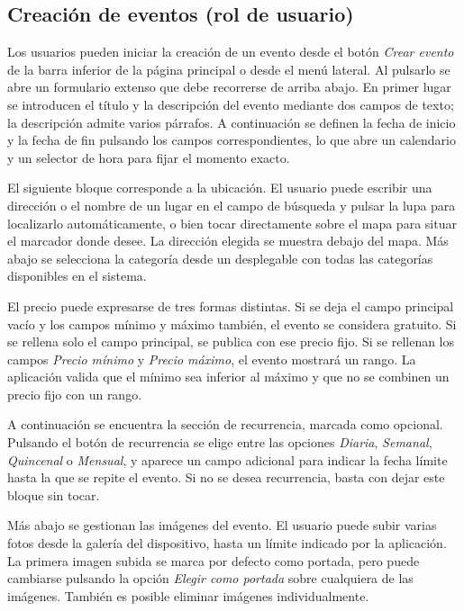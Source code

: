 \clearpage

\subsection{Creación de eventos (rol de usuario)}

Los usuarios pueden iniciar la creación de un evento desde el botón \textit{Crear evento} de la barra inferior de la página principal o desde el menú lateral. Al pulsarlo se abre un formulario extenso que debe recorrerse de arriba abajo. En primer lugar se introducen el título y la descripción del evento mediante dos campos de texto; la descripción admite varios párrafos. A continuación se definen la fecha de inicio y la fecha de fin pulsando los campos correspondientes, lo que abre un calendario y un selector de hora para fijar el momento exacto.

El siguiente bloque corresponde a la ubicación. El usuario puede escribir una dirección o el nombre de un lugar en el campo de búsqueda y pulsar la lupa para localizarlo automáticamente, o bien tocar directamente sobre el mapa para situar el marcador donde desee. La dirección elegida se muestra debajo del mapa. Más abajo se selecciona la categoría desde un desplegable con todas las categorías disponibles en el sistema.

El precio puede expresarse de tres formas distintas. Si se deja el campo principal vacío y los campos mínimo y máximo también, el evento se considera gratuito. Si se rellena solo el campo principal, se publica con ese precio fijo. Si se rellenan los campos \textit{Precio mínimo} y \textit{Precio máximo}, el evento mostrará un rango. La aplicación valida que el mínimo sea inferior al máximo y que no se combinen un precio fijo con un rango.

A continuación se encuentra la sección de recurrencia, marcada como opcional. Pulsando el botón de recurrencia se elige entre las opciones \textit{Diaria}, \textit{Semanal}, \textit{Quincenal} o \textit{Mensual}, y aparece un campo adicional para indicar la fecha límite hasta la que se repite el evento. Si no se desea recurrencia, basta con dejar este bloque sin tocar.

Más abajo se gestionan las imágenes del evento. El usuario puede subir varias fotos desde la galería del dispositivo, hasta un límite indicado por la aplicación. La primera imagen subida se marca por defecto como portada, pero puede cambiarse pulsando la opción \textit{Elegir como portada} sobre cualquiera de las imágenes. También es posible eliminar imágenes individualmente.

